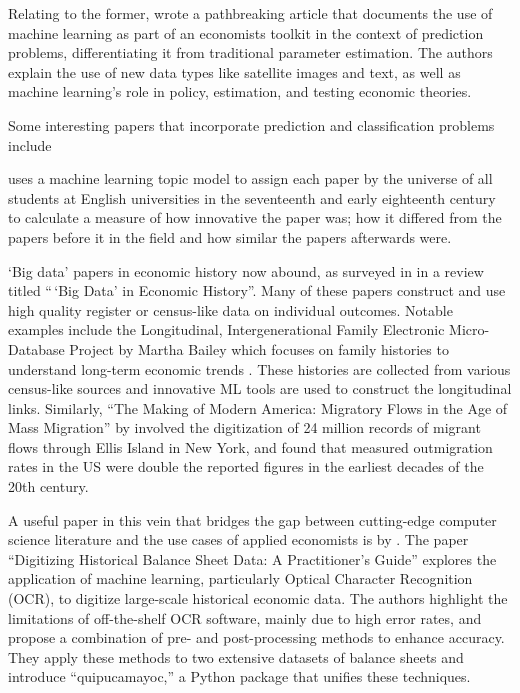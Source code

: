 \documentclass[
]{article}
\begin{document}
Relating to the former, \textcite{mullainathan2017machine} wrote a
pathbreaking article that documents the use of machine learning as part
of an economists toolkit in the context of prediction problems,
differentiating it from traditional parameter estimation. The authors
explain the use of new data types like satellite images and text, as
well as machine learning's role in policy, estimation, and testing
economic theories.

Some interesting papers that incorporate prediction and classification
problems include

\textcite{koschnick2023breaking} uses a machine learning topic model to
assign each paper by the universe of all students at English
universities in the seventeenth and early eighteenth century to
calculate a measure of how innovative the paper was; how it differed
from the papers before it in the field and how similar the papers
afterwards were.

`Big data' papers in economic history now abound, as surveyed in
\textcite{gutmann2018big} in a review titled ``\,`Big Data' in Economic
History''. Many of these papers construct and use high quality register
or census-like data on individual outcomes. Notable examples include the
Longitudinal, Intergenerational Family Electronic Micro-Database Project
by Martha Bailey which focuses on family histories to understand
long-term economic trends . These histories are collected from various
census-like sources and innovative ML tools are used to construct the
longitudinal links. Similarly, ``The Making of Modern America: Migratory
Flows in the Age of Mass Migration'' by \textcite{bandiera2013making}
involved the digitization of 24 million records of migrant flows through
Ellis Island in New York, and found that measured outmigration rates in
the US were double the reported figures in the earliest decades of the
20th century.

A useful paper in this vein that bridges the gap between cutting-edge
computer science literature and the use cases of applied economists is
by \textcite{correia2023digitizing}. The paper ``Digitizing Historical
Balance Sheet Data: A Practitioner's Guide'' explores the application of
machine learning, particularly Optical Character Recognition (OCR), to
digitize large-scale historical economic data. The authors highlight the
limitations of off-the-shelf OCR software, mainly due to high error
rates, and propose a combination of pre- and post-processing methods to
enhance accuracy. They apply these methods to two extensive datasets of
balance sheets and introduce ``quipucamayoc,'' a Python package that
unifies these techniques.
\end{document}

